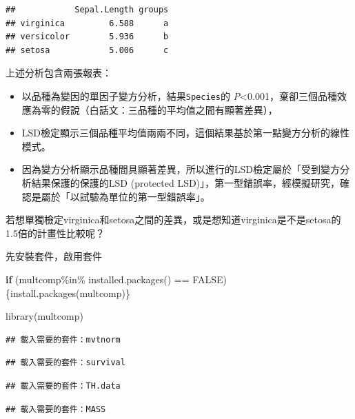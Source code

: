 \documentclass[
]{book}
\newenvironment{Shaded}{\begin{snugshade}}{\end{snugshade}}
\newcommand{\ConstantTok}[1]{\textcolor[rgb]{0.00,0.00,0.00}{#1}}
\newcommand{\ControlFlowTok}[1]{\textcolor[rgb]{0.13,0.29,0.53}{\textbf{#1}}}
\newcommand{\FunctionTok}[1]{\textcolor[rgb]{0.00,0.00,0.00}{#1}}
\newcommand{\NormalTok}[1]{#1}
\newcommand{\SpecialCharTok}[1]{\textcolor[rgb]{0.00,0.00,0.00}{#1}}
\newcommand{\StringTok}[1]{\textcolor[rgb]{0.31,0.60,0.02}{#1}}
\begin{document}
\begin{verbatim}
##            Sepal.Length groups
## virginica         6.588      a
## versicolor        5.936      b
## setosa            5.006      c
\end{verbatim}

上述分析包含兩張報表：

\begin{itemize}
\item
  以品種為變因的單因子變方分析，結果\texttt{Species}的 \emph{P}\textless0.001，棄卻三個品種效應為零的假說（白話文：三品種的平均值之間有顯著差異），
\item
  LSD檢定顯示三個品種平均值兩兩不同，這個結果基於第一點變方分析的線性模式。
\item
  因為變方分析顯示品種間具顯著差異，所以進行的LSD檢定屬於「受到變方分析結果保護的保護的LSD (protected LSD)」，第一型錯誤率，經模擬研究，確認是屬於「以試驗為單位的第一型錯誤率」。
\end{itemize}

若想單獨檢定virginica和setosa之間的差異，或是想知道virginica是不是setosa的1.5倍的計畫性比較呢？

先安裝套件，啟用套件

\begin{Shaded}
\begin{Highlighting}[]
\ControlFlowTok{if}\NormalTok{ (}\StringTok{\textquotesingle{}multcomp\textquotesingle{}}\SpecialCharTok{\%in\%} \FunctionTok{installed.packages}\NormalTok{() }\SpecialCharTok{==} \ConstantTok{FALSE}\NormalTok{) }
\NormalTok{\{}\FunctionTok{install.packages}\NormalTok{(}\StringTok{\textquotesingle{}multcomp\textquotesingle{}}\NormalTok{)\}}

\FunctionTok{library}\NormalTok{(multcomp)}
\end{Highlighting}
\end{Shaded}

\begin{verbatim}
## 載入需要的套件：mvtnorm
\end{verbatim}

\begin{verbatim}
## 載入需要的套件：survival
\end{verbatim}

\begin{verbatim}
## 載入需要的套件：TH.data
\end{verbatim}

\begin{verbatim}
## 載入需要的套件：MASS
\end{verbatim}
\end{document}
